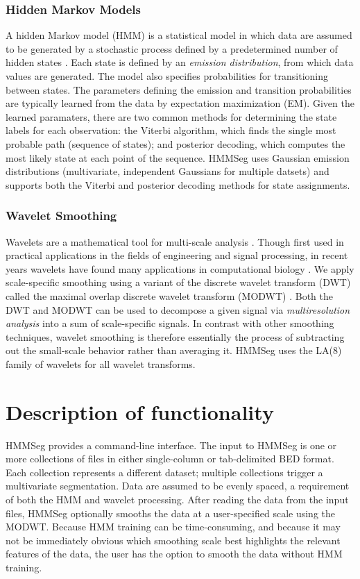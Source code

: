 \documentclass{bioinfo}
\begin{document}
\subsubsection*{Hidden Markov Models}
A hidden Markov model (HMM) is a statistical model in which data are
assumed to be generated by a stochastic process defined by a
predetermined number of hidden states \citep{rabiner:tutorial}.  Each
state is defined by an {\em emission distribution}, from which data
values are generated.  The model also specifies probabilities for
transitioning between states.  The parameters defining the emission
and transition probabilities are typically learned from the data by
expectation maximization (EM).  Given the learned paramaters, there
are two common methods for determining the state labels for each
observation: the Viterbi algorithm, which finds the single most
probable path (sequence of states); and posterior decoding, which
computes the most likely state at each point of the sequence.  HMMSeg
uses Gaussian emission distributions (multivariate, independent
Gaussians for multiple datsets) and supports both the Viterbi and
posterior decoding methods for state assignments.

\subsubsection*{Wavelet Smoothing}
Wavelets are a mathematical tool for multi-scale analysis
\citep{percival:wavelet}.  Though first used in practical
applications in the fields of engineering and signal processing, in
recent years wavelets have found many applications in computational
biology \citep{lio:wavelets}.  We apply scale-specific smoothing
using a variant of the discrete wavelet transform (DWT) called the
maximal overlap discrete wavelet transform (MODWT)
\citep{percival:wavelet}.  Both the DWT and MODWT can be used to
decompose a given signal via {\it multiresolution analysis} into a sum
of scale-specific signals.  In contrast with other smoothing
techniques, wavelet smoothing is therefore essentially the process of
subtracting out the small-scale behavior rather than averaging
it. HMMSeg uses the LA(8) family of wavelets for all wavelet
transforms.

\section{Description of functionality}

HMMSeg provides a command-line interface.  The input to HMMSeg is one
or more collections of files in either single-column or tab-delimited
BED format.  Each collection represents a different dataset; multiple
collections trigger a multivariate segmentation.  Data are assumed to
be evenly spaced, a requirement of both the HMM and wavelet
processing.  After reading the data from the input files, HMMSeg
optionally smooths the data at a user-specified scale using the MODWT.
Because HMM training can be time-consuming, and because it may not be
immediately obvious which smoothing scale best highlights the relevant
features of the data, the user has the option to smooth the data
without HMM training.
\end{document}

